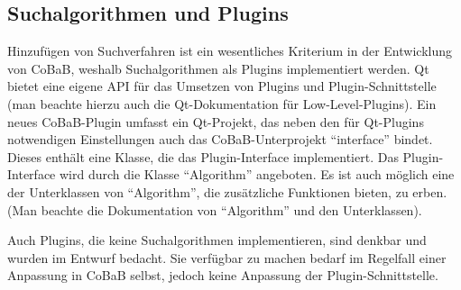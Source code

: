 \subsection{Suchalgorithmen und Plugins}
Hinzufügen von Suchverfahren ist ein wesentliches Kriterium in der Entwicklung von CoBaB, weshalb Suchalgorithmen als Plugins implementiert werden. Qt bietet eine eigene API für das Umsetzen von Plugins und Plugin-Schnittstelle (man beachte hierzu auch die Qt-Dokumentation für Low-Level-Plugins). Ein neues CoBaB-Plugin umfasst ein Qt-Projekt, das neben den für Qt-Plugins notwendigen Einstellungen auch das CoBaB-Unterprojekt \enquote{interface} bindet. Dieses enthält eine Klasse, die das Plugin-Interface implementiert. Das Plugin-Interface wird durch die Klasse \enquote{Algorithm} angeboten. Es ist auch möglich eine der Unterklassen von \enquote{Algorithm}, die zusätzliche Funktionen bieten, zu erben. (Man beachte die Dokumentation von \enquote{Algorithm} und den Unterklassen).

Auch Plugins, die keine Suchalgorithmen implementieren, sind denkbar und wurden im Entwurf bedacht. Sie verfügbar zu machen bedarf im Regelfall einer Anpassung in CoBaB selbst, jedoch keine Anpassung der Plugin-Schnittstelle.

